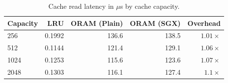 \begin{table}
\centering
\begin{tabular}{lrrrr}
\toprule
Capacity & LRU & ORAM (Plain) & ORAM (SGX) & Overhead \\
\midrule
256 & 0.1992 & 136.6 & 138.5 & $1.01\times$ \\
512 & 0.1144 & 121.4 & 129.1 & $1.06\times$ \\
1024 & 0.1253 & 115.6 & 123.6 & $1.07\times$ \\
2048 & 0.1303 & 116.1 & 127.4 & $1.1\times$ \\
\bottomrule
\end{tabular}
\caption{Cache read latency in ${}\mu$s by cache capacity.}
\label{tab:reproduction-table5}
\end{table}

